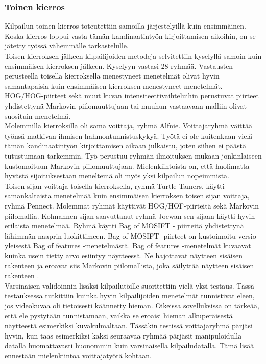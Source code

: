 \subsubsection {Toinen kierros}

Kilpailun toinen kierros toteutettiin samoilla järjestelyillä kuin ensimmäinen. Koska kierros loppui
vasta tämän kandinaatintyön kirjoittamisen aikoihin, on se jätetty työssä vähemmälle tarkastelulle.\\

Toisen kierroksen jälkeen kilpailijoiden metodeja selvitettiin kyselyllä samoin kuin ensimmäisen
kierroksen jälkeen. Kyselyyn vastasi 28 ryhmää. Vastausten perusteella toisella kierroksella menestyneet 
menetelmät olivat hyvin samantapaisia kuin ensimmäisen kierroksen menestyneet menetelmät. HOG/HOG-piirteet sekä muut
kuvan intensiteettivaihteluihin perustuvat piirteet yhdistettynä Markovin piilomuuttujaan tai muuhun
vastaavaan malliin olivat suosituin menetelmä.\\

Molemmilla kierroksilla oli sama voittaja, ryhmä Alfnie. 
Voittajaryhmä väittää työnsä matkivan ihmisen hahmontunnistuskykyä. Työtä ei ole kuitenkaan vielä tämän kandinaatintyön kirjoittamisen aikaan julkaistu,
 joten siihen ei päästä tutustumaan tarkemmin. Työ perustuu
ryhmän ilmoituksen mukaan jonkinlaiseen kustomoituun Markovin piilomuuttujaan. Mielenkiintoista on,
että huolimatta hyvästä sijoituksestaan meneltemä oli myös yksi kilpailun nopeimmista.\\

Toisen sijan voittaja toisella kierroksella, ryhmä Turtle Tamers, käytti samankaltaista menetelmää kuin 
ensimmäisen kierroksen toisen sijan voittaja, ryhmä Pennect. Molemmat ryhmät käyttivät HOG/HOF-piirteitä sekä Markovin piilomallia. 
Kolmannen sijan saavuttanut ryhmä Joewan sen sijaan käytti hyvin erilaista menetelmää. Ryhmä käytti Bag of MOSIFT -
piirteitä yhdistettynä lähimmän naaprin luokittimeen. Bag of MOSIFT -piirteet on kustoimoitu versio
yleisestä Bag of features -menetelmästä. Bag of features -menetelmät kuvaavat kuinka usein tietty 
arvo esiintyy näytteessä. Ne hajottavat näytteen sisäisen rakenteen ja eroavat siis Markovin piilomallista,
joka säilyttää näytteen sisäisen rakenteen \citep{}. \\

Varsinaisen validoinnin lisäksi kilpailutöille suoritettiin vielä yksi testaus. Tässä testauksessa tutkittiin kuinka 
hyvin kilpailijoiden menetelmät tunnistivat eleen, jos videokuvaa oli tietoisesti käännetty hieman. Oikeissa sovelluksissa on tärkeää,
että ele pystytään tunnistamaan, vaikka se eroaisi hieman alkuperäisestä näytteestä esimerkiksi kuvakulmaltaan. 
Tässäkin testissä voittajaryhmä pärjäsi hyvin, kun taas esimerkiksi kaksi seuraavaa ryhmää pärjäsit manipuloidulla datalla huomattavasti
huonommin kuin varsinaisella kilpailudatalla. Tämä lisää ennestään mielenkiintoa voittajatyötä kohtaan.



